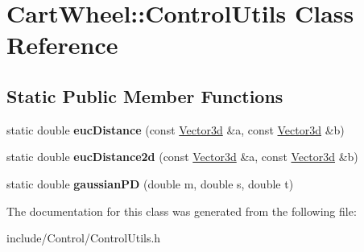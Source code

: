 \hypertarget{classCartWheel_1_1ControlUtils}{
\section{CartWheel::ControlUtils Class Reference}
\label{classCartWheel_1_1ControlUtils}
}
\subsection*{Static Public Member Functions}
\begin{DoxyCompactItemize}
\item 
\hypertarget{classCartWheel_1_1ControlUtils_a850fc39e2d5a6d9e65babd889db65974}{
static double {\bfseries eucDistance} (const \hyperlink{classCartWheel_1_1Math_1_1Vector3d}{Vector3d} \&a, const \hyperlink{classCartWheel_1_1Math_1_1Vector3d}{Vector3d} \&b)}
\label{classCartWheel_1_1ControlUtils_a850fc39e2d5a6d9e65babd889db65974}

\item 
\hypertarget{classCartWheel_1_1ControlUtils_a8deea572cf3db45027cd55dec6626db5}{
static double {\bfseries eucDistance2d} (const \hyperlink{classCartWheel_1_1Math_1_1Vector3d}{Vector3d} \&a, const \hyperlink{classCartWheel_1_1Math_1_1Vector3d}{Vector3d} \&b)}
\label{classCartWheel_1_1ControlUtils_a8deea572cf3db45027cd55dec6626db5}

\item 
\hypertarget{classCartWheel_1_1ControlUtils_a0686a23ddfaac504cd736045d0a26482}{
static double {\bfseries gaussianPD} (double m, double s, double t)}
\label{classCartWheel_1_1ControlUtils_a0686a23ddfaac504cd736045d0a26482}

\end{DoxyCompactItemize}


The documentation for this class was generated from the following file:\begin{DoxyCompactItemize}
\item 
include/Control/ControlUtils.h\end{DoxyCompactItemize}
